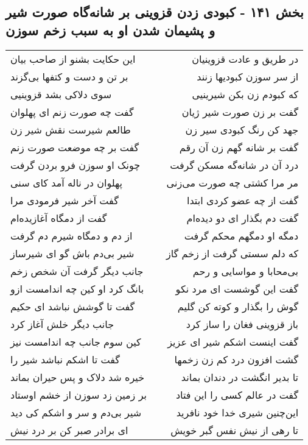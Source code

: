 \begin{center}
\section*{بخش ۱۴۱ - کبودی زدن قزوینی بر شانه‌گاه صورت شیر و پشیمان شدن او به سبب زخم سوزن}
\label{sec:sh141}
\begin{longtable}{l p{0.5cm} r}
این حکایت بشنو از صاحب بیان
&&
در طریق و عادت قزوینیان
\\
بر تن و دست و کتفها بی‌گزند
&&
از سر سوزن کبودیها زنند
\\
سوی دلاکی بشد قزوینیی
&&
که کبودم زن بکن شیرینیی
\\
گفت چه صورت زنم ای پهلوان
&&
گفت بر زن صورت شیر ژیان
\\
طالعم شیرست نقش شیر زن
&&
جهد کن رنگ کبودی سیر زن
\\
گفت بر چه موضعت صورت زنم
&&
گفت بر شانه گهم زن آن رقم
\\
چونک او سوزن فرو بردن گرفت
&&
درد آن در شانه‌گه مسکن گرفت
\\
پهلوان در ناله آمد کای سنی
&&
مر مرا کشتی چه صورت می‌زنی
\\
گفت آخر شیر فرمودی مرا
&&
گفت از چه عضو کردی ابتدا
\\
گفت از دمگاه آغازیده‌ام
&&
گفت دم بگذار ای دو دیده‌ام
\\
از دم و دمگاه شیرم دم گرفت
&&
دمگه او دمگهم محکم گرفت
\\
شیر بی‌دم باش گو ای شیرساز
&&
که دلم سستی گرفت از زخم گاز
\\
جانب دیگر گرفت آن شخص زخم
&&
بی‌محابا و مواسایی و رحم
\\
بانگ کرد او کین چه اندامست ازو
&&
گفت این گوشست ای مرد نکو
\\
گفت تا گوشش نباشد ای حکیم
&&
گوش را بگذار و کوته کن گلیم
\\
جانب دیگر خلش آغاز کرد
&&
باز قزوینی فغان را ساز کرد
\\
کین سوم جانب چه اندامست نیز
&&
گفت اینست اشکم شیر ای عزیز
\\
گفت تا اشکم نباشد شیر را
&&
گشت افزون درد کم زن زخمها
\\
خیره شد دلاک و پس حیران بماند
&&
تا بدیر انگشت در دندان بماند
\\
بر زمین زد سوزن از خشم اوستاد
&&
گفت در عالم کسی را این فتاد
\\
شیر بی‌دم و سر و اشکم کی دید
&&
این‌چنین شیری خدا خود نافرید
\\
ای برادر صبر کن بر درد نیش
&&
تا رهی از نیش نفس گبر خویش
\\

\end{longtable}
\end{center}

